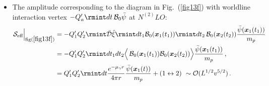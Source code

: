\begin{itemize}
 \item The amplitude corresponding to the diagram in Fig.~(\ref{fig13f}) with worldline interaction vertex $-Q_a'\rmint dt\,\mathcal{B}_0\Bar{\psi}$ at $N^{(2)}LO :$
\begin{align}
    \begin{split}
         \mathcal{S}_{\text{eff}}\Big |_{\text{fig}(\ref{fig13f})}&=-Q_1'Q_2'\rmint\Bar{\mathcal{D}}\Hat{\xi}\rmint dt_1\mathcal{B}_0(\boldsymbol{x}_1(t_1))\rmint dt_2\,\mathcal{B}_0(\boldsymbol{x}_2(t_2))\frac{\Bar{\psi}(\boldsymbol{x}_1(t_1))}{m_p}\\&
       =-Q_1'Q_2'\rmint dt_1 dt_2\Big{\langle}\,\mathcal{B}_0(\boldsymbol{x}_1(t_1))\mathcal{B}_0(\boldsymbol{x}_2(t_2))\Big{\rangle}\frac{\Bar{\psi}(\boldsymbol{x}_1(t_1))}{m_p}\,, \\&
       =Q_1'Q_2'\rmint dt\frac{e^{-\mu_{\gamma} r}}{4\pi r}\frac{\Bar{\psi}(\boldsymbol{x}_1(t))}{m_p}+(1\leftrightarrow 2)\,\,\sim\mathcal{O}(L^{1/2}v^{5/2})\,.
    \end{split}
\end{align}
\end{itemize}
